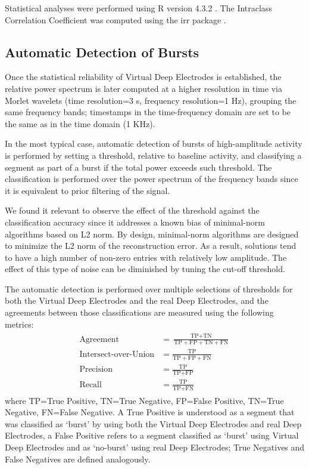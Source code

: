 \documentclass[draftcls, onecolumn, peerreview]{IEEEtran}
\begin{document}
Statistical analyses were performed using R version  4.3.2 \cite{R_software}. The Intraclass Correlation Coefficient was computed using the irr package \cite{irr}. 


\subsection{Automatic Detection of Bursts}

Once the statistical reliability of Virtual Deep Electrodes is established, the relative power spectrum is later computed at a higher resolution in time via Morlet wavelets (time resolution=3 s, frequency resolution=1 Hz), grouping the same frequency bands; timestamps in the time-frequency domain are set to be the same as in the time domain (1 KHz).

In the most typical case, automatic detection of bursts of high-amplitude activity is performed by setting a threshold, relative to baseline activity, and classifying a segment as part of a burst if the total power exceeds such threshold.
%
The classification is performed over the power spectrum of the frequency bands since it is equivalent to prior filtering of the signal.

We found it relevant to observe the effect of the threshold against the classification accuracy since it addresses a known bias of minimal-norm algorithms based on L2 norm.
%
By design, minimal-norm algorithms are designed to minimize the L2 norm of the reconstruction error. 
%
As a result, solutions tend to have a high number of non-zero entries with relatively low amplitude.
%
The effect of this type of noise can be diminished by tuning the cut-off threshold.

The automatic detection is performed over multiple selections of thresholds for both the Virtual Deep Electrodes and the real Deep Electrodes, and the agreements between those classifications are measured using the following metrics:
\begin{align}
\begin{split}
    \text{Agreement} &= \frac{\text{TP}+\text{TN}}{\text{TP}+\text{FP}+\text{TN}+\text{FN}} \\
    \text{Intersect-over-Union} &= \frac{\text{TP}}{\text{TP}+\text{FP}+\text{FN}} \\
    \text{Precision} &= \frac{\text{TP}}{\text{TP}+\text{FP}} \\
    \text{Recall} &= \frac{\text{TP}}{\text{TP}+\text{FN}}
\end{split}
\end{align}
where TP=True Positive, TN=True Negative, FP=False Positive, TN=True Negative, FN=False Negative. 
%
A True Positive is understood as a segment that was classified as `burst' by using both the Virtual Deep Electrodes and real Deep Electrodes, a False Positive refers to a segment classified as `burst' using Virtual Deep Electrodes and as `no-burst' using real Deep Electrodes; True Negatives and False Negatives are defined analogously.
\end{document}
